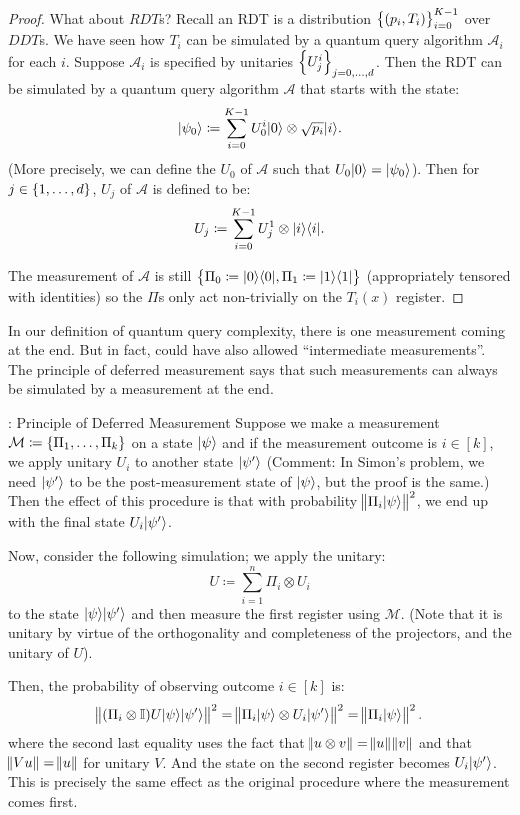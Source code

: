 \begin{proof}
What about $RDT$s? Recall an RDT is a distribution $\set{(p_i, T_i)}_{i=0}^{K-1}$ over $DDT$s. We have seen how $T_i$ can be simulated by a quantum query algorithm $\mathcal{A}_i$ for each $i$. Suppose $\mathcal{A}_i$ is specified by unitaries $\set{U_j^i}_{j=0, \ldots, d}$. Then the RDT can be simulated by a quantum query algorithm $\mathcal{A}$ that starts with the state:
\begin{equation}
    \lvert \psi_0 \rangle \coloneqq \sum_{i=0}^{K-1}U_0^i \lvert 0 \rangle \otimes \sqrt{p_i}\lvert i \rangle.
\end{equation}
(More precisely, we can define the $U_0$ of $\mathcal{A}$ such that $U_0\lvert 0 \rangle = \lvert \psi_0 \rangle$). Then for $j \in \set{1, \ldots, d}$, $U_j$ of $\mathcal{A}$ is defined to be:
\begin{equation}
    U_j \coloneqq \sum_{i=0}^{K-1}U_j^1 \otimes \lvert i \rangle \langle i \rvert.
\end{equation}

The measurement of $\mathcal{A}$ is still $\set{\Pi_0 \coloneqq \lvert 0 \rangle \langle 0 \rvert, \Pi_1 \coloneqq \lvert 1 \rangle \langle 1 \rvert}$ (appropriately tensored with identities) so the $\Pi$s only act non-trivially on the $T_i(x)$ register.
\end{proof}

In our definition of quantum query complexity, there is one measurement coming at the end. But in fact, could have also allowed ``intermediate measurements''. The principle of deferred measurement says that such measurements can always be simulated by a measurement at the end.
\begin{factbox}{: Principle of Deferred Measurement}
    Suppose we make a measurement $\mathcal{M} \coloneqq \set{\Pi_1, \ldots, \Pi_k}$ on a state $\lvert \psi \rangle$ and if the measurement outcome is $i \in [k]$, we apply unitary $U_i$ to another state $\lvert \psi' \rangle$ (Comment: In Simon's problem, we need $\lvert \psi' \rangle$ to be the post-measurement state of $\lvert \psi \rangle$, but the proof is the same.) Then the effect of this procedure is that with probability $\norm{\Pi_i \lvert \psi \rangle}^2$, we end up with the final state $U_i\lvert \psi' \rangle$.

    Now, consider the following simulation; we apply the unitary:
    \begin{equation}
        U \coloneqq \sum_{i=1}^n \Pi_i \otimes U_i
    \end{equation}
    to the state $\lvert \psi \rangle\lvert \psi' \rangle$ and then measure the first register using $\mathcal{M}$. (Note that it is unitary by virtue of the orthogonality and completeness of the projectors, and the unitary of $U$).

    Then, the probability of observing outcome $i \in [k]$ is:
    \begin{equation}
        \norm{(\Pi_i \otimes \mathbb{I})U\lvert \psi \rangle\lvert \psi' \rangle}^2 = \norm{\Pi_i\lvert \psi \rangle \otimes U_i\lvert \psi' \rangle}^2 = \norm{\Pi_i \lvert \psi \rangle}^2.
    \end{equation}
    where the second last equality uses the fact that $\norm{u \otimes v} = \norm{u}\norm{v}$ and that $\norm{Vu} = \norm{u}$ for unitary $V$. And the state on the second register becomes $U_i\lvert \psi' \rangle$. This is precisely the same effect as the original procedure where the measurement comes first.
\end{factbox}

